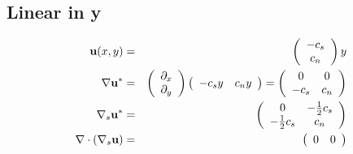 \documentclass[11pt]{report}
\begin{document}
\subsection{Linear in y\label{linear_y}}
\begin{eqnarray}
{\bf u}(x,y) &=& \left( \begin{array}{c} -c_s \\ c_n \end{array}   \right)y \\
\nabla{\bf u}^* &=& \left( \begin{array}{c} \partial_x \\ \partial_y \end{array}   \right) \left( \begin{array}{cc} -c_sy & c_ny \end{array}   \right)
 =  \left( \begin{array}{cc}  0 & 0 \\ -c_s & c_n  \end{array}   \right) \\
\nabla_s{\bf u}^* &=&  \left( \begin{array}{cc} 0 & -\frac{1}{2}c_s \\ -\frac{1}{2}c_s & c_n \end{array}   \right) \\
\nabla\cdot\left(\nabla_s{\bf u}\right) &=&  \left( \begin{array}{cc} 0 & 0 \end{array}   \right)
\end{eqnarray}
\end{document}
